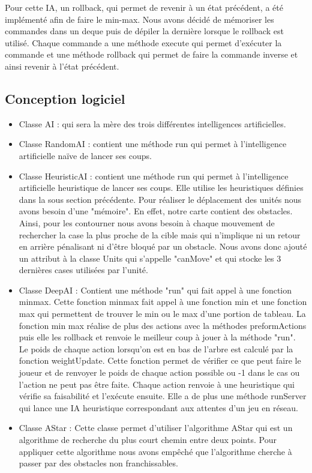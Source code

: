 \documentclass[12pt,a4paper]{article}
\begin{document}
Pour cette IA, un rollback, qui permet de revenir à un état précédent, a été implémenté afin de faire le min-max. Nous avons décidé de mémoriser les commandes dans un deque puis de dépiler la dernière lorsque le rollback est utilisé. Chaque commande a une méthode execute qui permet d'exécuter la commande et une méthode rollback qui permet de faire la commande inverse et ainsi revenir à l'état précédent.

\subsection{Conception logiciel}
\begin{itemize}
    \item Classe AI : qui sera la mère des trois différentes intelligences artificielles.
    \item Classe RandomAI : contient une méthode run qui permet à l'intelligence artificielle naïve de lancer ses coups. 
    \item Classe HeuristicAI : contient une méthode run qui permet à l'intelligence artificielle heuristique de lancer ses coups. Elle utilise les heuristiques définies dans la sous section précédente. Pour réaliser le déplacement des unités nous avons besoin d'une "mémoire". En effet, notre carte contient des obstacles. Ainsi, pour les contourner nous avons besoin à chaque mouvement de rechercher la case la plus proche de la cible mais qui n'implique ni un retour en arrière pénalisant ni d'être bloqué par un obstacle. Nous avons donc ajouté un attribut à la classe Units qui s'appelle "canMove" et qui stocke les 3 dernières cases utilisées par l'unité.
    \item Classe DeepAI : Contient une méthode "run" qui fait appel à une fonction minmax. Cette fonction minmax fait appel à une fonction min et une fonction max qui permettent de trouver le min ou le max d'une portion de tableau. La fonction min max réalise de plus des actions avec la méthodes preformActions puis elle les rollback et renvoie le meilleur coup à jouer à la méthode "run". Le poids de chaque action lorsqu'on est en bas de l'arbre est calculé par la fonction weightUpdate. Cette fonction permet de vérifier ce que peut faire le joueur et de renvoyer le poids de chaque action possible ou -1 dans le cas ou l'action ne peut pas être faite. Chaque action renvoie à une heuristique qui vérifie sa faisabilité et l'exécute ensuite. 
    Elle a de plus une méthode runServer qui lance une IA heuristique correspondant aux attentes d'un jeu en réseau.
    \item Classe AStar : Cette classe permet d'utiliser l'algorithme AStar qui est un algorithme de recherche du plus court chemin entre deux points. Pour appliquer cette algorithme nous avons empêché que l'algorithme cherche à passer par des obstacles non franchissables.
\end{itemize}
\newpage
\end{document}
